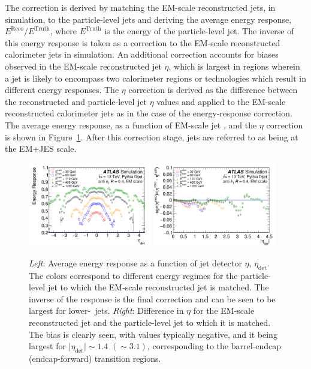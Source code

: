 The correction is derived by matching the EM-scale reconstructed jets, in simulation, to the particle-level
jets and deriving the average energy response, $E^{\text{Reco}} / E^{\text{Truth}}$, where $E^{\text{Truth}}$ is the
energy of the particle-level jet.
The inverse of this energy response is taken as a correction to the EM-scale reconstructed calorimeter jets in simulation.
An additional correction accounts for biases observed in the EM-scale reconstructed jet $\eta$, which is largest
in regions wherein a jet is likely to encompass two calorimeter regions or technologies which result in different
energy responses.
The $\eta$ correction is derived as the difference between the reconstructed and particle-level jet $\eta$ values and
applied to the EM-scale reconstructed calorimeter jets as in the case of the energy-response correction.
The average energy response, as a function of EM-scale jet \pT, and the $\eta$ correction is shown
in Figure~\ref{fig:abs_jes_response}.
After this correction stage, jets are referred to as being at the EM+JES scale.

\begin{figure}[!htb]
    \begin{center}
        \includegraphics[width=0.48\textwidth]{figures/chapter3/jets/abs_jes_response}
        \includegraphics[width=0.48\textwidth]{figures/chapter3/jets/abs_jes_eta}
        \caption{
            \textit{Left}: Average energy response as a function of jet detector $\eta$, $\eta_{\text{det}}$.
            The colors correspond to different energy regimes for the particle-level jet to which the EM-scale
            reconstructed jet is matched. The inverse of the response is the final correction and can be seen to be
            largest for lower-\pT~jets.
            \textit{Right}: Difference in $\eta$ for the EM-scale reconstructed jet and the particle-level jet to which
            it is matched. The bias is clearly seen, with values typically negative, and it being largest
            for $\lvert \eta_{\text{det}} \rvert \sim 1.4$ $(\sim 3.1)$, corresponding to the barrel-endcap (endcap-forward)
            transition regions.
        }
        \label{fig:abs_jes_response}
    \end{center}
\end{figure}
\FloatBarrier

